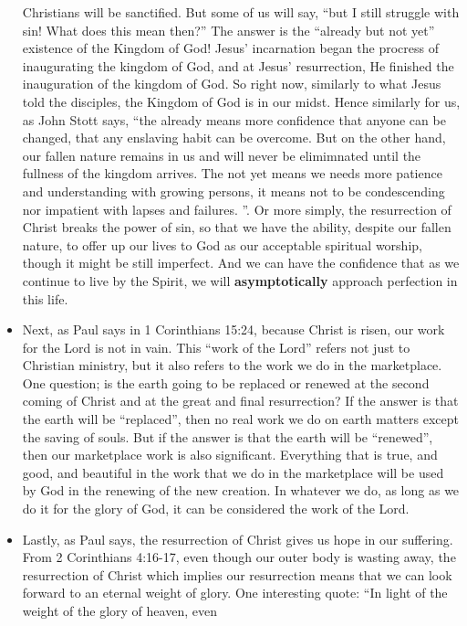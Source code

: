 \begin{itemize}
{  Christians will be sanctified.  But some of us will say, ``but I still
  struggle with sin!  What does this mean then?'' The answer is the ``already
  but not yet'' existence of the Kingdom of God!  Jesus' incarnation began
  the procress of inaugurating the kingdom of God, and at Jesus'
  resurrection, He finished the inauguration of the kingdom of God.  So right
  now, similarly to what Jesus told the disciples, the Kingdom of God is in
  our midst.  Hence similarly for us, as John Stott says, ``the already means
  more confidence that anyone can be changed, that any enslaving habit can be
  overcome.  But on the other hand, our fallen nature remains in us and will
  never be elimimnated until the fullness of the kingdom arrives.  The not
  yet means we needs more patience and understanding with growing persons,
  it means not to be condescending nor impatient with lapses and failures.
  ''.  Or more simply, the resurrection of Christ breaks the power of sin, so
  that we have the ability, despite our fallen nature, to offer up our lives
  to God as our acceptable spiritual worship, though it might be still
  imperfect.  And we can have the confidence that as we continue to live by
  the Spirit, we will \textbf{asymptotically} approach perfection in this
  life.  }
  \item{Next, as Paul says in 1 Corinthians 15:24, because Christ is risen,
  our work for the Lord is not in vain.  This ``work of the Lord'' refers not
  just to Christian ministry, but it also refers to the work we do in the
  marketplace.  One question; is the earth going to be replaced or renewed at
  the second coming of Christ and at the great and final resurrection?  If
  the answer is that the earth will be ``replaced'', then no real work we do
  on earth matters except the saving of souls.  But if the answer is that the
  earth will be ``renewed'', then our marketplace work is also significant.
  Everything that is true, and good, and beautiful in the work that we do in
  the marketplace will be used by God in the renewing of the new creation.
  In whatever we do, as long as we do it for the glory of God, it can be
  considered the work of the Lord.}
  \item{Lastly, as Paul says, the resurrection of Christ gives us hope in our
  suffering.  From 2 Corinthians 4:16-17, even though our outer body is
  wasting away, the resurrection of Christ which implies our resurrection
  means that we can look forward to an eternal weight of glory.  One
  interesting quote: ``In light of the weight of the glory of heaven, even
}
\end{itemize}
